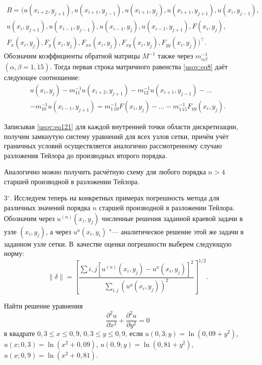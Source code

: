 \begin{multline*}
B=\Big(u(x_{i+2},y_{j+1}), u(x_{i+1},y_{j-1}), u(x_{i+1},y_{j}),
u(x_{i+1},y_{j+1}), u(x_{i},y_{j-1}),\\
u(x_{i},y_{j+1}), u(x_{i-1},y_{j-1}), u(x_{i-1},y_{j}),
u(x_{i-1},y_{j+1}), F(x_i,y_j),\\
F_x(x_i,y_j), F_y(x_i,y_j), F_{xx}(x_i,y_j), F_{xy}(x_i,y_j),
F_{yy}(x_i,y_j) \Big)^\top.
\end{multline*}
Обозначим коэффициенты обратной матрицы $M^{-1}$ также через
$m_{\alpha \beta}^{-1}$ $(\alpha, \beta = \overline{1, 15})$. Тогда
первая строка матричного равенства \eqref{usov:eq8} даёт следующее
соотношение:
\begin{multline}
\label{usov:eq121} u(x_i,y_j) - m_{11}^{-1} u (x_{i+2}, y_{j+1}) -
m^{-1}_{12}
u(x_{i+1},y_{j-1})-\ldots\\
-m^{-1}_{10} u(x_{i-1},y_{j+1})=m^{-1}_{1\,10}
F(x_{i},y_{j})-\ldots-m^{-1}_{1\,15} F_{yy}(x_{i},y_{j}).
\end{multline}

Записывая \eqref{usov:eq121} для каждой внутренней точки области
дискретизации, получим замкнутую систему уравнений для всех узлов
сетки, причём учёт граничных условий осуществляется аналогично
рассмотренному случаю разложения Тейлора до производных второго
порядка.

Аналогично можно получить расчётную схему для любого порядка $n>4$
старшей производной в разложении Тейлора.

\smallskip

3$^\circ$. Исследуем теперь на конкретных примерах погрешность
метода для различных значений порядка $n$ старшей производной в
разложении Тейлора. Обозначим через $u^{(n)} (x_i,y_j)$ численные
решения заданной краевой задачи в узле $(x_i,y_j)$, а через $u^a
(x_i,y_i)$ "--- аналитическое решение этой же задачи в заданном
узле сетки. В~качестве оценки погрешности выберем следующую норму:
\begin{equation}
\label{usov:eq14} \| \delta\|=\left[ \frac{\sum {i,j}
\left[u^{(n)}(x_i,y_j) - u^a (x_i,y_j) \right]^2} {\sum
_{i,j} (u^a(x_i, y_j))^2}\right]^{1/2}.
\end{equation}

\begin{example}[1]
Найти решение уравнения
\begin{equation}
\frac{\partial ^2 u}{\partial x^2}+\frac{\partial ^2 u}{\partial
y^2}=0
\label{usov:eq15}
\end{equation}
в квадрате $0,3 \leq x \leq 0,9$, $0,3 \leq y \leq 0,9$, если $u(0,3;y) =\ln (0,09+y^2)$,
$u(x; 0,3)=\ln(x^2+0,09)$, $u(0,9;y) =\ln (0,81+y^2)$, $u(x; 0,9)=\ln(x^2+0,81)$.
\end{example}

